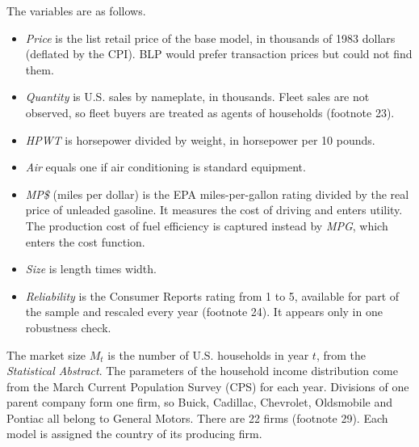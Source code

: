 The variables are as follows.
\begin{itemize}
\item \emph{Price} is the list retail price of the base model, in thousands of 1983 dollars (deflated
  by the CPI). BLP would prefer transaction prices but could not find them.
\item \emph{Quantity} is U.S. sales by nameplate, in thousands. Fleet sales are not observed, so fleet
  buyers are treated as agents of households (footnote 23).
\item \emph{HPWT} is horsepower divided by weight, in horsepower per 10 pounds.
\item \emph{Air} equals one if air conditioning is standard equipment.
\item \emph{MP\$} (miles per dollar) is the EPA miles-per-gallon rating divided by the real price of
  unleaded gasoline. It measures the cost of driving and enters utility. The production cost of fuel
  efficiency is captured instead by \emph{MPG}, which enters the cost function.
\item \emph{Size} is length times width.
\item \emph{Reliability} is the Consumer Reports rating from 1 to 5, available for part of the sample
  and rescaled every year (footnote 24). It appears only in one robustness check.
\end{itemize}
The market size $M_t$ is the number of U.S. households in year $t$, from the \emph{Statistical
Abstract}. The parameters of the household income distribution come from the March Current Population
Survey (CPS) for each year. Divisions of one parent company form one firm, so Buick, Cadillac,
Chevrolet, Oldsmobile and Pontiac all belong to General Motors. There are 22 firms (footnote 29). Each
model is assigned the country of its producing firm.

